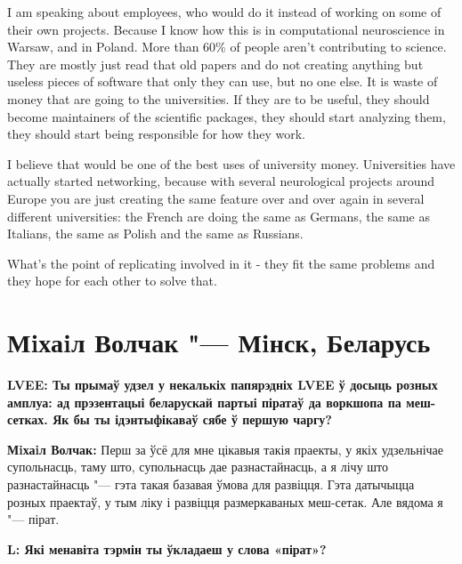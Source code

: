 \documentclass[10pt, a5paper]{article}
\begin{document}
\begin{Parallel}[p]{}{}
{I am speaking about employees, who would do it instead of working on some of their own projects. Because I know how this is in computational neuroscience in Warsaw, and in Poland. More than 60\% of people aren’t contributing to science. They are mostly just read that old papers and do not creating anything but useless pieces of software that only they can use, but no one else. It is waste of money that are going to the universities. If they are to be useful, they should become maintainers of the scientific packages, they should start analyzing them, they should start being responsible for how they work.

I believe that would be one of the best uses of university money. Universities have actually started networking, because with several neurological projects around Europe you are just creating the same feature over and over again in several different universities: the French are doing the same as Germans, the same as Italians, the same as Polish and the same as Russians.
 
What's the point of replicating involved in it - they fit the same problems and they hope for each other to solve that. 


     }
   \end{Parallel}







\section{Мiхаiл Волчак "---  Мiнск, Беларусь}

{\noindent \bf LVEE: Ты прымаў удзел у некалькіх папярэдніх LVEE ў досыць розных амплуа: ад прэзентацыі беларускай партыі піратаў да воркшопа па меш-сетках. Як бы ты ідэнтыфікаваў сябе ў першую чаргу?
}

{\noindent \bf Мiхаiл Волчак:} Перш за ўсё для мне цікавыя такія праекты, у якіх удзельнічае супольнасць, таму што, супольнасць дае разнастайнасць, а я лічу што разнастайнасць "--- гэта такая базавая ўмова для развіцця. Гэта датычыцца розных праектаў, у тым ліку і развіцця размеркаваных меш-сетак. Але вядома я "--- пірат.

{\noindent \bf L: Які менавіта тэрмін ты ўкладаеш у слова «пірат»?}
\end{document}
